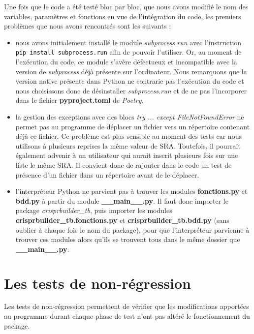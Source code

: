 \documentclass[twoside,a4paper,11pt,frenchb,openany]{report}
\begin{document}
Une fois que le code a été testé bloc par bloc, que nous avons modifié le nom des variables, paramètres et fonctions en vue de l'intégration du code, les premiers problèmes que nous avons rencontrés sont les suivants :  
\begin{itemize}
\item nous avons initialement installé le module \textit{subprocess.run} avec l'instruction \\\texttt{pip install subprocess.run} afin de pouvoir l'utiliser. Or, au moment de l'exécution du code, ce module s'avère défectueux et incompatible avec la version de \textit{subprocess} déjà présente sur l'ordinateur. Nous remarquons que la version native présente dans Python ne contrarie pas l'exécution du code et nous choisissons donc de désinstaller \textit{subprocess.run} et de ne pas l'incorporer dans le fichier \textbf{pyproject.toml} de \textit{Poetry}.
\item la gestion des exceptions avec des blocs \textit{try ... except FileNotFoundError} ne permet pas au programme de déplacer un fichier vers un répertoire contenant déjà ce fichier. Ce problème est plus sensible au moment des tests car nous utilisons à plusieurs reprises la même valeur de SRA. Toutefois, il pourrait également advenir à un utilisateur qui aurait inscrit plusieurs fois sur une liste le même SRA. Il convient donc de rajouter dans le code un test de présence d'un fichier dans un répertoire avant de le déplacer.
\item l'interpréteur Python ne parvient pas à trouver les modules \textbf{fonctions.py} et \textbf{bdd.py} à partir du module \textbf{\_\_main\_\_.py}. Il faut donc importer le package \textit{crisprbuilder\_tb}, puis importer les modules \textbf{crisprbuilder\_tb.fonctions.py} et \textbf{crisprbuilder\_tb.bdd.py} (sans oublier à chaque fois le nom du package), pour que l'interpréteur parvienne à trouver ces modules alors qu'ils se trouvent tous dans le même dossier que \textbf{\_\_main\_\_.py}.
\end{itemize}






\section{Les tests de non-régression}

Les tests de non-régression permettent de vérifier que les modifications apportées au programme durant chaque phase de test n'ont pas altéré le fonctionnement du package.
\end{document}
